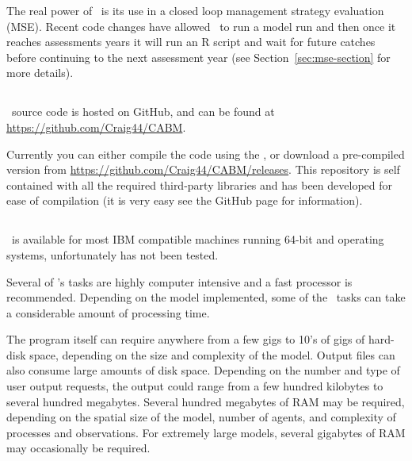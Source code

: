 The real power of \IBM\ is its use in a closed loop management strategy evaluation (MSE). Recent code changes have allowed \IBM\ to run a model run and then once it reaches assessments years it will run an R script and wait for future catches before continuing to the next assessment year (see Section~\ref{sec:mse-section} for more details).

\subsection{}
\IBM\ source code is hosted on GitHub, and can be found at \url{https://github.com/Craig44/CABM}.

Currently you can either compile the code using the , or download a pre-compiled version from \url{https://github.com/Craig44/CABM/releases}. This repository is self contained with all the required third-party libraries and has been developed for ease of compilation (it is very easy see the GitHub page for information). 

\subsection{}
\IBM\ is available for most IBM compatible machines running 64-bit  and  operating systems, unfortunately  has not been tested.

Several of \IBM 's tasks are highly computer intensive and a fast processor is recommended. Depending on the model implemented, some of the \IBM\ tasks can take a considerable amount of processing time.

The program itself can require anywhere from a few gigs to 10's of gigs of hard-disk space, depending on the size and complexity of the model. Output files can also consume large amounts of disk space. Depending on the number and type of user output requests, the output could range from a few hundred kilobytes to several hundred megabytes. Several hundred megabytes of RAM may be required, depending on the spatial size of the model, number of agents, and complexity of processes and observations. For extremely large models, several gigabytes of RAM may occasionally be required. 

\subsection{}

